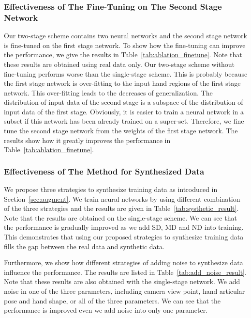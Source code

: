 \documentclass{article}
\begin{document}
\subsubsection{Effectiveness of The Fine-Tuning on The Second Stage Network}
Our two-stage scheme contains two neural networks and the second stage network is fine-tuned on the first stage network. To show how the fine-tuning can improve the performance, we give the results in Table~\ref{tab:ablation_finetune}. Note that these results are obtained using real data only. 
Our two-stage scheme without fine-tuning performs worse than the single-stage scheme. This is probably because the first stage network is over-fitting to the input hand regions of the first stage network. This over-fitting leads to the decreases of generalization.
The distribution of input data of the second stage is a subspace of the distribution of input data of the first stage. Obviously, it is easier to train a neural network in a subset if this network has been already trained on a super-set. Therefore, we fine tune the second stage network from the weights of the first stage network. The results show how it greatly improves the performance in Table~\ref{tab:ablation_finetune}. 


\subsubsection{Effectiveness of The Method for Synthesized Data}
We propose three strategies to synthesize training data as introduced in Section~\ref{sec:augment}. We train neural networks by using different combination of the three strategies and the results are given in Table~\ref{tab:systhetic_result}. Note that the results are obtained on the single-stage scheme. We can see that the performance is gradually improved as we add SD, MD and ND into training. This demonstrates that using our proposed strategies to synthesize training data fills the gap between the real data and synthetic data.

Furthermore, we show how different strategies of adding noise to synthesize data influence the performance. The results are listed in Table~\ref{tab:add_noise_result}. Note that these results are also obtained with the single-stage network. We add noise in one of the three parameters, including camera view point, hand articular pose and hand shape, or all of the three parameters. We can see that the performance is improved even we add noise into only one parameter. 
\end{document}
